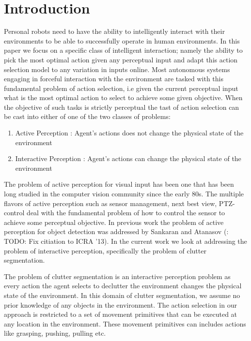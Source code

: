 \section{Introduction}
\label{sec:intro}
Personal robots need to have the ability to intelligently interact with their environments to be able to successfully operate in human environments. In this paper we focus on a specific class of intelligent interaction; namely the ability to pick the most optimal action given any perceptual input and adapt this action selection model to any variation in inputs online. Most autonomous systems engaging in forceful interaction with the environment are tasked with this fundamental problem of action selection, i.e given the current perceptual input what is the most optimal action to select to achieve some given objective. When the objective of such tasks is strictly perceptual the tast of action selection can be cast into either of one of the two classes of problems:\\
\begin{enumerate}
 \item Active Perception : Agent's actions does not change the physical state of the environment\\ 
 \item Interactive Perception : Agent's actions can change the physical state of the environment\\
\end{enumerate}

The problem of active perception for visual input has been one that has been long studied in the computer vision community since the early 80s. The multiple flavors of active perception such as sensor management, next best view, PTZ-control deal with the fundamental problem of how to control the sensor to achieve some perceptual objective. In previous work the problem of active perception for object detection was addressed by Sankaran and Atanasov (\cite{Javidi12_Journal}: TODO: Fix citiation to ICRA '13). In the current work we look at addressing the problem of interactive perception, specifically the problem of clutter segmentation.  

The problem of clutter segmentation is an interactive perception problem as every action the agent selects to declutter the environment changes the physical state of the environment. In this domain of clutter segmentation, we assume no prior knowledge of any objects in the environment. The action selection in our approach is restricted to a set of movement primitives that can be executed at any location in the environment. These movement primitives can includes actions like grasping, pushing, pulling etc.

